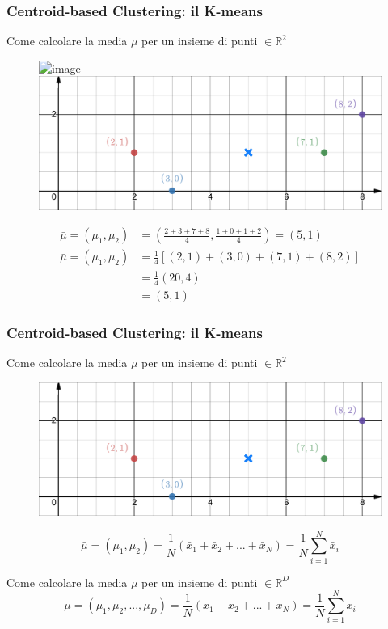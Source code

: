 \begin{frame}

	\frametitle{{\color{GradientDescentDiagramBlue}Centroid-based Clustering}: il K-means}

	\begin{scriptsize}
	\begin{block}{Come calcolare la media $\mu$ per un insieme di punti $\in \mathbb{R}^2$}
		\begin{figure}[!htbp]
			\centering
			\includegraphics<1>[width=0.56\linewidth]{images/unsupervised/kmeans/mean_r2.png}
			\includegraphics<2>[width=0.56\linewidth]{images/unsupervised/kmeans/mean_r2_mean.png}
		\end{figure}
		
		\begin{align}
			\bar \mu = (\mu_1, \mu_2) &= \left(\frac{2+3+7+8}{4}, \frac{1+0+1+2}{4}\right) = (5,1)\nonumber \\
			\bar \mu = (\mu_1, \mu_2) &= \frac{1}{4} \left[(2,1) + (3,0) + (7,1) + (8,2)\right] \nonumber \\
			& = \frac{1}{4} (20, 4) \nonumber \\
			& = (5,1) \nonumber
		\end{align}
	\end{block}
	\end{scriptsize}
	
\end{frame}


\begin{frame}

	\frametitle{{\color{GradientDescentDiagramBlue}Centroid-based Clustering}: il K-means}
	
	\begin{scriptsize}
	\begin{block}{Come calcolare la media $\mu$ per un insieme di punti $\in \mathbb{R}^2$}
		\begin{figure}[!htbp]
			\centering
			\includegraphics[width=0.5\linewidth]{images/unsupervised/kmeans/mean_r2_mean.png}
		\end{figure}
		
		$$\bar \mu = (\mu_1, \mu_2) = \frac{1}{N} (\bar x_1 + \bar x_2 + ... + \bar x_N) = \frac{1}{N}\sum_{i=1}^{N} \bar x_i$$

	\end{block}
	
	\begin{block}{Come calcolare la media $\mu$ per un insieme di punti $\in \mathbb{R}^D$}
		$$\bar \mu = (\mu_1, \mu_2, ..., \mu_D) = \frac{1}{N} (\bar x_1 + \bar x_2 + ... + \bar x_N) = \frac{1}{N}\sum_{i=1}^{N} \bar x_i$$
	\end{block}
	\end{scriptsize}

\end{frame}





